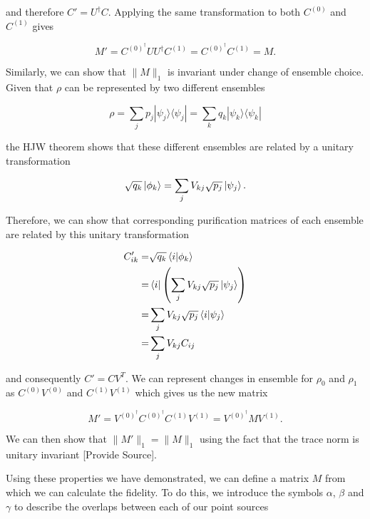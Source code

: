 \documentclass{article}
\newcommand{\ketbra}[2]{|#1\rangle\langle#2|}
\begin{document}
and therefore $C' = U^\dagger C$.  Applying the same transformation to both $C^{(0)}$ and $C^{(1)}$ gives

\begin{equation}
M' = C^{(0)^\dagger} U U^\dagger C^{(1)} =   C^{(0)^\dagger} C^{(1)} =  M.
\end{equation}

Similarly, we can show that $\|M\|_1$ is invariant under change of ensemble choice. Given that $\rho$ can be represented by two different ensembles

\begin{equation}
\rho = \sum_j p_j \ketbra{\psi_j}{\psi_j} = \sum_k q_k \ketbra{\psi_k}{\psi_k}
\end{equation}

the HJW theorem shows that these different ensembles are related by a unitary transformation

\begin{equation}
\sqrt{q_k} \ket{\phi_k} = \sum_j V_{kj} \sqrt{p_j} \ket{\psi_j}.
\end{equation}

Therefore, we can show that corresponding purification matrices of each ensemble are related by this unitary transformation

\begin{equation}
\begin{aligned}
C'_{ik} = & \sqrt{q_k} \braket{i|\phi_k} \\
= & \bra{i}\left(\sum_j V_{kj} \sqrt{p_j} \ket{\psi_j} \right) \\
= & \sum_j V_{kj} \sqrt{p_j} \braket{i|\psi_j}\\
= & \sum_j V_{kj} C_{ij}
\end{aligned}
\end{equation}

and consequently $C' = CV^{T}$.
We can represent changes in ensemble for $\rho_0$ and $\rho_1$ as $C^{(0)} V^{(0)}$ and $C^{(1)} V^{(1)}$ which gives us the new matrix

\begin{equation}
M' = V^{(0)^\dagger} C^{(0)^\dagger} C^{(1)} V^{(1)} = V^{(0)^\dagger} M V^{(1)}.
\end{equation}

We can then show that $\|M'\|_1 = \|M\|_1$ using the fact that the trace norm is unitary invariant [Provide Source].

Using these properties we have demonstrated, we can define a matrix $M$ from which we can calculate the fidelity.
To do this, we introduce the symbols $\alpha$, $\beta$ and $\gamma$ to describe the overlaps between each of our point sources
\end{document}
